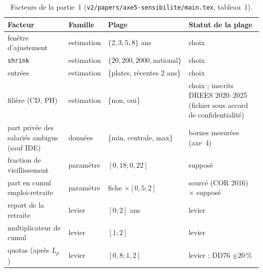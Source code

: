 \begin{table}[h]
\centering\small
\begin{tabular}{p{4.0cm}llp{3.6cm}}
\toprule
Facteur & Famille & Plage & Statut de la plage \\
\midrule
fenêtre d'ajustement & estimation & $\{2, 3, 5, 8\}$ ans & choix \\
\texttt{shrink} & estimation & $\{20, 200, 2000, \text{national}\}$ & choix \\
entrées & estimation & \{plates, récentes 2 ans\} & choix \\
filière (CD, PH) & estimation & \{non, oui\} & choix ; inscrits DREES 2020--2025 (fichier sous accord de
  confidentialité) \\
part privée des salariés ambigus (sauf IDE) & données & \{min, centrale, max\} & bornes mesurées (axe~4) \\
fraction de vieillissement & paramètre & $[0{,}18 ; 0{,}22]$ & supposé\suppose{} \\
part en cumul emploi-retraite & paramètre & fiche $\times [0{,}5 ; 2]$ & sourcé (COR 2016) $\times$ supposé \\
report de la retraite & levier & $[0 ; 2]$ ans & levier \\
multiplicateur de cumul & levier & $[1 ; 2]$ & levier \\
quotas (après $L_p$) & levier & $[0{,}8 ; 1{,}2]$ & levier ; DD76 $\pm 20$\,\% \\
\bottomrule
\end{tabular}
\caption{Facteurs de la partie~1 (\texttt{v2/papers/axe5-sensibilite/main.tex}, tableau~1).}
\label{sen:tab:facteurs}
\end{table}

